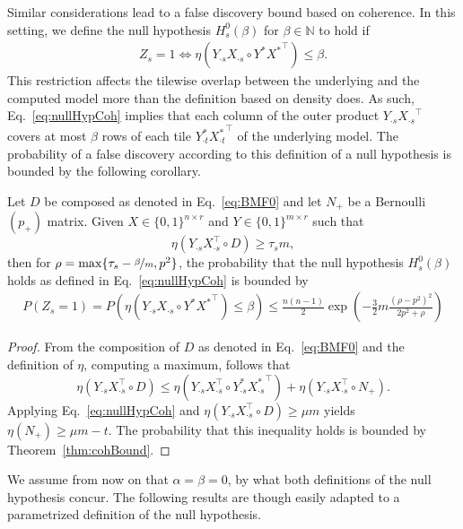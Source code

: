 Similar considerations lead to a false discovery bound based on coherence. In this setting, we define the null hypothesis $H_s^0(\beta)$ for $\beta\in\mathbb{N}$ to hold if 
\begin{align}\label{eq:nullHypCoh}
Z_s=1 \Leftrightarrow \eta(Y_{\cdot s}X_{\cdot s}\circ Y^*{X^*}^\top)\leq \beta.
\end{align}
This restriction affects the tilewise overlap between the underlying and the computed model more than the definition based on density does. As such, Eq.~\eqref{eq:nullHypCoh} implies that each column of the outer product $Y_{\cdot s}{X_{\cdot s}}^\top$ covers at most $\beta$ rows of each tile $Y^*_{\cdot t}{X^*_{\cdot t}}^\top$ of the underlying model. The probability of a false discovery according to this definition of a null hypothesis is bounded by the following corollary. 
\begin{corollary}\label{thm:cohZ}
Let $D$ be composed as denoted in Eq.~\eqref{eq:BMF0} and let $N_+$ be a Bernoulli $(p_+)$ matrix. Given $X\in\{0,1\}^{n\times r}$ and $Y\in\{0,1\}^{m\times r}$ such that 
\[\eta(Y_{\cdot s}X_{\cdot s}^\top \circ D)\geq \tau_s m,\] 
then for $\rho = \max\{\tau_s-\nicefrac{\beta}{m},p^2\}$, the probability that the null hypothesis $H_s^0(\beta)$ holds as defined in Eq.~\eqref{eq:nullHypCoh} is bounded by
\begin{align*}
P(Z_s=1)=P\left(\eta(Y_{\cdot s}X_{\cdot s}\circ Y^*{X^*}^\top)\leq \beta\right)\leq \frac{n(n-1)}{2}\exp\left(-\frac{3}{2}m\frac{(\rho-p^2)^2}{2p^2+\rho}\right)
\end{align*}
\end{corollary}
\begin{proof} 
From the composition of $D$ as denoted in Eq.~\eqref{eq:BMF0} and the definition of $\eta$, computing a maximum, follows that 
\[\eta(Y_{\cdot s}X_{\cdot s}^\top \circ D)\leq \eta(Y_{\cdot s}X_{\cdot s}^\top \circ Y^*_{\cdot s}{X^*_{\cdot s}}^\top)+\eta(Y_{\cdot s}X_{\cdot s}^\top \circ N_+).\]
Applying Eq.~\eqref{eq:nullHypCoh} and $\eta(Y_{\cdot s}X_{\cdot s}^\top \circ D)\geq \mu m$ yields
$\eta(N_+)\geq \mu m-t$.
The probability that this inequality holds is bounded by Theorem~\ref{thm:cohBound}.
\end{proof}
We assume from now on that $\alpha=\beta=0$, by what both definitions of the null hypothesis concur. The following results are though easily adapted to a parametrized definition of the null hypothesis.  
